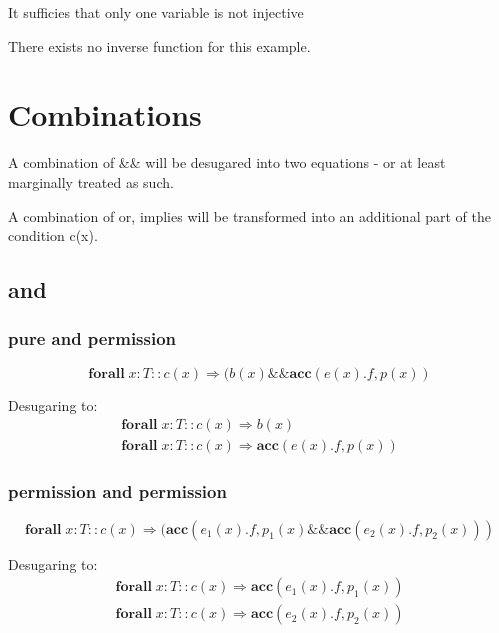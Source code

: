 \documentclass[12pt]{article}
\begin{document}
It sufficies that only one variable is not injective

There exists no inverse function for this example.

\section{Combinations}
A combination of \&\& will be desugared into two equations - or at least marginally treated as such.


A combination of or, implies will be transformed into an additional part of the condition c(x).

\subsection{and}
\subsubsection{pure and permission}
\begin{equation}
	\mathbf{forall} \; x:T :: c(x) \Rightarrow (b(x) \&\& \mathbf{acc}(e(x).f, p(x))
\end{equation}

Desugaring to:
\begin{equation}
\begin{aligned}
	\mathbf{forall} \; x:T :: c(x)  \Rightarrow b(x)\\
	\mathbf{forall} \; x:T :: c(x) \Rightarrow \mathbf{acc}(e(x).f, p(x))
\end{aligned}
\end{equation}

\subsubsection{permission and permission}

\begin{equation}
	\mathbf{forall} \; x:T :: c(x) \Rightarrow ( \mathbf{acc}(e_1(x).f, p_1(x) \&\& \mathbf{acc}(e_2(x).f, p_2(x) ))
\end{equation}

Desugaring to:
\begin{equation}
\begin{aligned}
	\mathbf{forall} \; x:T :: c(x) \Rightarrow \mathbf{acc}(e_1(x).f, p_1(x))\\
	\mathbf{forall} \; x:T :: c(x) \Rightarrow \mathbf{acc}(e_2(x).f, p_2(x))
\end{aligned}
\end{equation}
\end{document}
